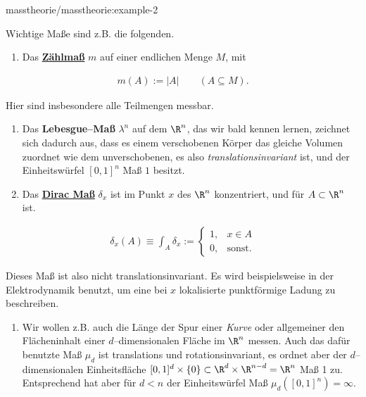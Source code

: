 \begin{example}{}{masstheorie/masstheorie:example-2}



\par
Wichtige Maße sind z.B. die folgenden.
\begin{enumerate}

\item {} 
\par
Das \href{https://de.wikipedia.org/wiki/Z\%c3\%a4hlma\%c3\%9f\_(Ma\%c3\%9ftheorie)}{\textbf{Zählmaß}} \(m\) auf einer endlichen Menge \(M\), mit

\end{enumerate}
\begin{align*}
m(A):=|A|\qquad (A\subseteq M).
\end{align*}
\par
Hier sind insbesondere alle Teilmengen messbar.
\begin{enumerate}

\item {} 
\par
Das \textbf{Lebesgue–Maß} \(\lambda^n\) auf dem \(\R^n\), das wir bald kennen lernen, zeichnet sich dadurch aus, dass es einem verschobenen Körper das gleiche Volumen zuordnet wie dem unverschobenen, es also \emph{translationsinvariant} ist, und der Einheitswürfel \([0,1]^n\) Maß \(1\) besitzt.

\item {} 
\par
Das \href{https://de.wikipedia.org/wiki/Diracma\%c3\%9f}{\textbf{Dirac Maß}} \(\delta_x\) ist im Punkt \(x\) des \(\R^n\) konzentriert, und für \(A\subset\R^n\) ist.

\end{enumerate}
\begin{align*}
\delta_x(A)\equiv \int_A\delta_x := \begin{cases} 1, &  x \in A\\ 0, & \text{sonst.} \end{cases}

\end{align*}
\par
Dieses Maß ist also nicht translationsinvariant. Es wird beispielsweise in der Elektrodynamik benutzt, um eine bei \(x\) lokalisierte punktförmige Ladung zu beschreiben.
\begin{enumerate}

\item {} 
\par
Wir wollen z.B. auch die Länge der Spur einer \emph{Kurve} oder allgemeiner den Flächeninhalt einer \(d\)–dimensionalen Fläche im \(\R^n\) messen. Auch das dafür benutzte Maß \(\mu_d\) ist translations  und rotationsinvariant, es ordnet aber der \(d\)–dimensionalen Einheitsfläche \([0,1]^d\times\{0\} \subset\R^d\times\R^{n-d}=\R^n\) Maß 1 zu. Entsprechend hat aber für \(d<n\) der Einheitswürfel Maß \(\mu_d([0,1]^n)=\infty\).


\end{enumerate}
\end{example}
